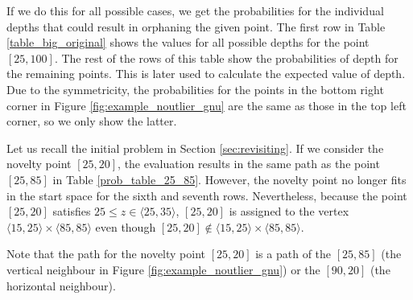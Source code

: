 If we do this for all possible cases, we get the probabilities for the individual depths that could result in orphaning the given point. The first row in Table \ref{table_big_original} shows the values for all possible depths for the point $[25,100]$. 
The rest of the rows of this table show the probabilities of depth for the remaining points.
This is later used to calculate the expected value of depth.
Due to the symmetricity, the probabilities for the points in the bottom right corner in Figure \ref{fig:example_noutlier_gnu} are the same as those in the top left corner, so we only show the latter.

Let us recall the initial problem in Section \ref{sec:revisiting}.
If we consider the novelty point $[25,20]$, the evaluation results in the same path as the point $[25,85]$ in Table \ref{prob_table_25_85}. However, the novelty point no longer fits in the start space for the sixth and seventh rows. Nevertheless, because the point $[25,20]$ satisfies $25 \le z \in \langle 25, 35 \rangle$,  $[25,20]$ is assigned to the vertex $\langle 15, 25 \rangle \times \langle 85, 85 \rangle$ even though $[25,20] \notin \langle 15, 25 \rangle \times \langle 85, 85 \rangle$.

Note that the path for the novelty point $[25,20]$ is a path of the $[25,85]$ (the vertical neighbour in Figure \ref{fig:example_noutlier_gnu}) or the $[90,20]$ (the horizontal neighbour).



